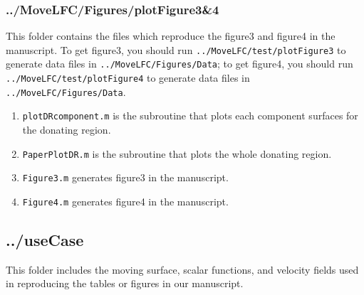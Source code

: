\documentclass[twoside,a4paper]{article}
\begin{document}
\subsubsection{../MoveLFC/Figures/plotFigure3\&4}
This folder contains the files which reproduce the figure3 and figure4 in the manuscript. To get figure3, you should run \texttt{../MoveLFC/test/plotFigure3} to generate data files in \texttt{../MoveLFC/Figures/Data}; to get figure4, you should run \texttt{../MoveLFC/test/plotFigure4} to generate data files in \texttt{../MoveLFC/Figures/Data}.
\begin{enumerate}
    \item \texttt{plotDRcomponent.m} is the subroutine that plots each component surfaces for the donating region.
    \item \texttt{PaperPlotDR.m} is the subroutine that plots the whole donating region.
    \item \texttt{Figure3.m} generates figure3 in the manuscript.
    \item \texttt{Figure4.m} generates figure4 in the manuscript.
\end{enumerate}

\subsection{../useCase}
This folder includes the moving surface, scalar functions, and velocity fields used in reproducing the tables or figures in our manuscript.




\end{document}
